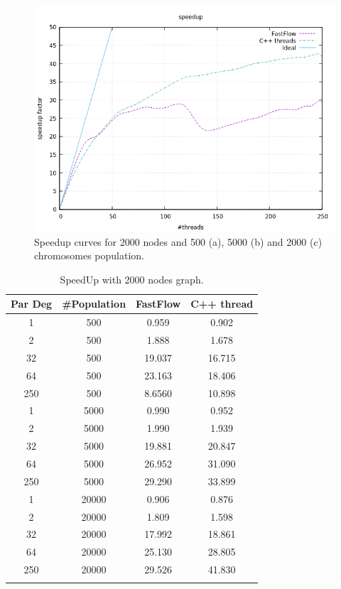 \documentclass[a4paper,10pt]{article}
\begin{document}
\begin{figure}[H]
		\begin{minipage}[t]{0.32\linewidth}
			\includegraphics[width=\linewidth]{BenchMarkTSP/speedup/2000/SU200020000_zoom.png}
			\subcaption{}
		\end{minipage}
		\caption{Speedup curves for 2000 nodes and 500 (a), 5000 (b) and 2000 (c) chromosomes population.}
		\label{2000}
	\end{figure}

\begin{center}
	\small\addtolength{\tabcolsep}{5pt}
	\centering
	\begin{longtable}{|c|c|c|c|}
		\hline
		\textbf{Par Deg} & \textbf{\#Population} & \textbf{FastFlow} & \textbf{C++ thread}  \\ \hline
		1         &  500     & 0.959 &  0.902   \\ \hline
		2         &  500     & 1.888 &  1.678   \\ \hline
		32       &  500     & 19.037 &  16.715   \\ \hline
		64       &  500     & 23.163 &  18.406   \\ \hline
		250     &  500     & 8.6560 &  10.898   \\ \hline
		1         &  5000   & 0.990 &  0.952   \\ \hline
		2         &  5000   & 1.990 &  1.939   \\ \hline
		32       &  5000   & 19.881 &  20.847   \\ \hline
		64       &  5000   & 26.952 &  31.090   \\ \hline
		250     &  5000   & 29.290 &  33.899   \\ \hline
		1         &  20000 & 0.906 &  0.876   \\ \hline
		2         &  20000 & 1.809 &  1.598   \\ \hline
		32       &  20000 & 17.992 &  18.861   \\ \hline
		64       &  20000 & 25.130 &  28.805   \\ \hline
		250     &  20000 & 29.526 &  41.830   \\ \hline				
		\caption{SpeedUp with 2000 nodes graph.}	
		\label{tab:dati2000}
	\end{longtable}	
\end{center}
\end{document}
